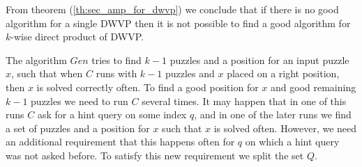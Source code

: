 From theorem (\ref{th:sec_amp_for_dwvp}) we conclude that if there is no good algorithm for a single DWVP
then it is not possible to find a good algorithm for $k$-wise direct product of DWVP.

The algorithm $Gen$ tries to find $k-1$ puzzles and a position for an input puzzle $x$, such that
when $C$ runs with $k-1$ puzzles and $x$ placed on a right position, then $x$ is solved correctly often.
To find a good position for $x$ and good remaining $k-1$ puzzles we need to run $C$ several times.
It may happen that in one of this runs $C$ ask for a hint query on some index $q$, and
in one of the later runs we find a set of puzzles and a position for $x$ such that $x$ is solved often.
However, we need an additional requirement that this happens often for $q$ on which a hint query was not asked before.
To satisfy this new requirement we split the set $Q$.


